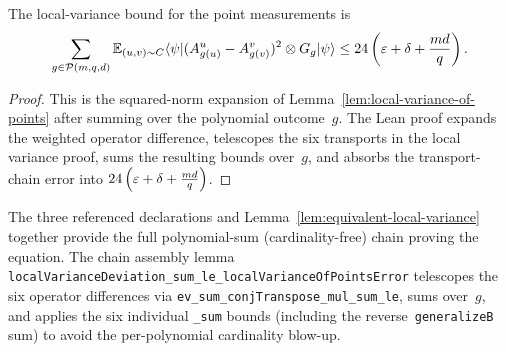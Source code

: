\begin{lemma}\label{lem:equivalent-local-variance}
	\leanok
	The local-variance bound for the point measurements is
	\begin{equation}
		\sum_{g \in \mathcal{P}(m,q,d)} \mathbb{E}_{(u,v)\sim C} \langle \psi \rvert (A^u_{g(u)}-A^v_{g(v)})^2 \otimes G_g \lvert \psi \rangle
		\le
		24\left(\varepsilon+\delta+\frac{md}{q}\right).
		\label{eq:equivalent-local-variance}
	\end{equation}
\end{lemma}
\begin{proof}
	\leanok
	This is the squared-norm expansion of Lemma~\ref{lem:local-variance-of-points}
	after summing over the polynomial outcome~$g$.  The Lean proof expands the
	weighted operator difference, telescopes the six transports in the local
	variance proof, sums the resulting bounds over~$g$, and absorbs the
	transport-chain error into
	$24\left(\varepsilon+\delta+\frac{md}{q}\right)$.
\end{proof}

\begin{remark}\label{rem:equivalent-local-variance-formalization-inputs}
	The three referenced declarations and Lemma~\ref{lem:equivalent-local-variance} together provide the full polynomial-sum (cardinality-free) chain proving the equation.  The chain assembly lemma \texttt{localVarianceDeviation\_sum\_le\_localVarianceOfPointsError} telescopes the six operator differences via \texttt{ev\_sum\_conjTranspose\_mul\_sum\_le}, sums over~$g$, and applies the six individual \texttt{\_sum} bounds (including the reverse~\texttt{generalizeB} sum) to avoid the per-polynomial cardinality blow-up.
\end{remark}


